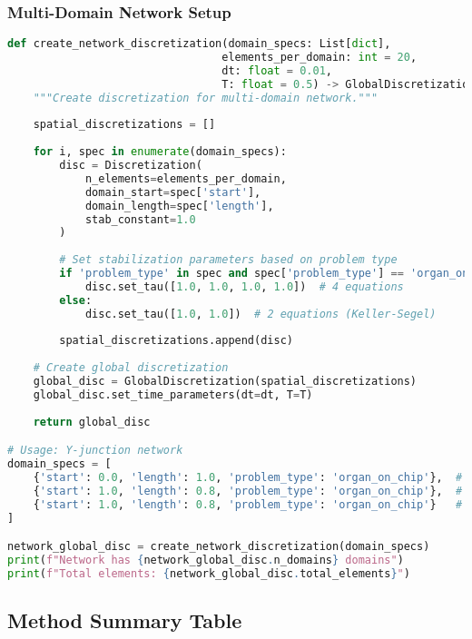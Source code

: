 \subsubsection{Multi-Domain Network Setup}

\begin{lstlisting}[language=Python, caption=Multi-Domain Network Discretization]
def create_network_discretization(domain_specs: List[dict],
                                 elements_per_domain: int = 20,
                                 dt: float = 0.01,
                                 T: float = 0.5) -> GlobalDiscretization:
    """Create discretization for multi-domain network."""
    
    spatial_discretizations = []
    
    for i, spec in enumerate(domain_specs):
        disc = Discretization(
            n_elements=elements_per_domain,
            domain_start=spec['start'],
            domain_length=spec['length'],
            stab_constant=1.0
        )
        
        # Set stabilization parameters based on problem type
        if 'problem_type' in spec and spec['problem_type'] == 'organ_on_chip':
            disc.set_tau([1.0, 1.0, 1.0, 1.0])  # 4 equations
        else:
            disc.set_tau([1.0, 1.0])  # 2 equations (Keller-Segel)
        
        spatial_discretizations.append(disc)
    
    # Create global discretization
    global_disc = GlobalDiscretization(spatial_discretizations)
    global_disc.set_time_parameters(dt=dt, T=T)
    
    return global_disc

# Usage: Y-junction network
domain_specs = [
    {'start': 0.0, 'length': 1.0, 'problem_type': 'organ_on_chip'},  # Main
    {'start': 1.0, 'length': 0.8, 'problem_type': 'organ_on_chip'},  # Branch 1
    {'start': 1.0, 'length': 0.8, 'problem_type': 'organ_on_chip'}   # Branch 2
]

network_global_disc = create_network_discretization(domain_specs)
print(f"Network has {network_global_disc.n_domains} domains")
print(f"Total elements: {network_global_disc.total_elements}")
\end{lstlisting}

\subsection{Method Summary Table}
\label{subsec:discretization_method_summary}


